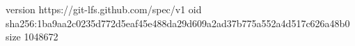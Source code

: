 version https://git-lfs.github.com/spec/v1
oid sha256:1ba9aa2c0235d772d5eaf45e488da29d609a2ad37b775a552a4d517c626a48b0
size 1048672
